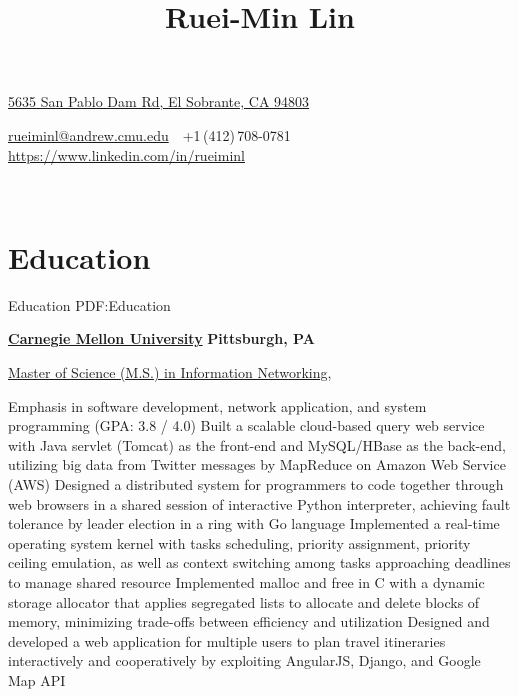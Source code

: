 \documentclass[a4paper,10pt,oneside]{article}
\begin{document}

\title{Ruei-Min Lin}

\begin{subtitle}
\href{https://www.google.com/maps/place/5635+San+Pablo+Dam+Rd,+El+Sobrante,+CA+94803}
{5635 San Pablo Dam Rd, El Sobrante, CA 94803}
\par
\href{mailto:rueiminl@andrew.cmu.edu}
{rueiminl@andrew.cmu.edu}
\,\BulletSymbol\,
+1\,(412)\,708-0781
\,\BulletSymbol\,
\href{https://www.linkedin.com/in/rueiminl}
{https://www.linkedin.com/in/rueiminl}
\end{subtitle}

\begin{body}

\\[-2.5em]

\section{Education}
{Education}
{PDF:Education}

\href{http://www.cmu.edu/}
{\textbf{Carnegie Mellon University}}
\hfill
\textbf{Pittsburgh, PA}


\SmallEntryGap
\href{http://www.ini.cmu.edu/degrees/msin/index.html}
{Master of Science (M.S.) in Information Networking},

\begin{detail}

\BulletItem
Emphasis in software development, network application, and system programming (GPA: 3.8 / 4.0)
\BulletItem
Built a scalable cloud-based query web service with Java servlet (Tomcat) as the front-end and MySQL/HBase as the back-end, utilizing big data from Twitter messages by MapReduce on Amazon Web Service (AWS)
\BulletItem
Designed a distributed system for programmers to code together through web browsers in a shared session of interactive Python interpreter, achieving fault tolerance by leader election in a ring with Go language
\BulletItem
Implemented a real-time operating system kernel with tasks scheduling, priority assignment, priority ceiling emulation, as well as context switching among tasks approaching deadlines to manage shared resource
\BulletItem
Implemented malloc and free in C with a dynamic storage allocator that applies segregated lists to allocate and delete blocks of memory, minimizing trade-offs between efficiency and utilization
\BulletItem
Designed and developed a web application for multiple users to plan travel itineraries interactively and cooperatively by exploiting AngularJS, Django, and Google Map API
\end{detail}



\end{body}
\end{document}
